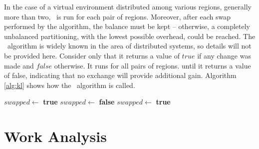 
In the case of a virtual environment distributed among various regions, generally more than two, \kl\ is run for each pair of regions. Moreover, after each swap performed by the algorithm, the balance must be kept -- otherwise, a completely unbalanced partitioning, with the lowest possible overhead, could be reached. The \kl\ algorithm is widely known in the area of distributed systems, so details will not be provided here. Consider only that it returns a value of $true$ if any change was made and $false$ otherwise. It runs for all pairs of regions. until it returns a value of false, indicating that no exchange will provide additional gain. Algorithm \ref{alg:kl} shows how the \kl\ algorithm is called.


\begin{algorithm}
\caption{\kl}
\label{alg:kl}
\begin{algorithmic}[1]

	\STATE $swapped \leftarrow$ \textbf{true}
		\STATE $swapped \leftarrow$ \textbf{false}
					\STATE $swapped \leftarrow$ \textbf{true}
				\ENDIF
			\ENDFOR
		\ENDFOR
	\ENDWHILE

\end{algorithmic}
\end{algorithm}



\section{Work Analysis}

